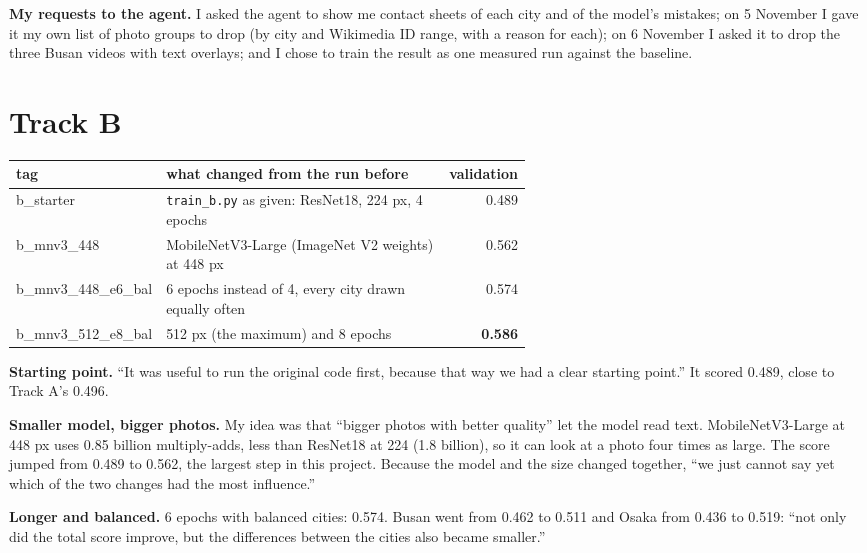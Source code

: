 \documentclass[11pt]{article}
\begin{document}
\textbf{My requests to the agent.} I asked the agent to show me contact sheets of each city and of the
model's mistakes; on 5 November I gave it my own list of photo groups to drop
(by city and Wikimedia ID range, with a reason for each); on 6 November I
asked it to drop the three Busan videos with text overlays; and I chose to
train the result as one measured run against the baseline.

\section*{Track B}

\begin{center}\footnotesize
\begin{tabular}{lp{0.6\linewidth}r}
\toprule
tag & what changed from the run before & validation \\
\midrule
b\_starter & \texttt{train\_b.py} as given: ResNet18, 224 px, 4 epochs & 0.489 \\
b\_mnv3\_448 & MobileNetV3-Large (ImageNet V2 weights) at 448 px & 0.562 \\
b\_mnv3\_448\_e6\_bal & 6 epochs instead of 4, every city drawn equally often & 0.574 \\
b\_mnv3\_512\_e8\_bal & 512 px (the maximum) and 8 epochs & \textbf{0.586} \\
\bottomrule
\end{tabular}
\end{center}

\textbf{Starting point.} ``It was useful to run the original code first,
because that way we had a clear starting point.'' It scored 0.489, close to
Track A's 0.496.

\textbf{Smaller model, bigger photos.} My idea was that ``bigger photos with
better quality'' let the model read text. MobileNetV3-Large at 448 px uses 0.85
billion multiply-adds, less than ResNet18 at 224 (1.8 billion), so it can look
at a photo four times as large. The score jumped from 0.489 to 0.562, the
largest step in this project. Because the model and the size changed together,
``we just cannot say yet which of the two changes had the most influence.''

\textbf{Longer and balanced.} 6 epochs with balanced cities: 0.574. Busan went
from 0.462 to 0.511 and Osaka from 0.436 to 0.519: ``not only did the total
score improve, but the differences between the cities also became smaller.''
\end{document}

